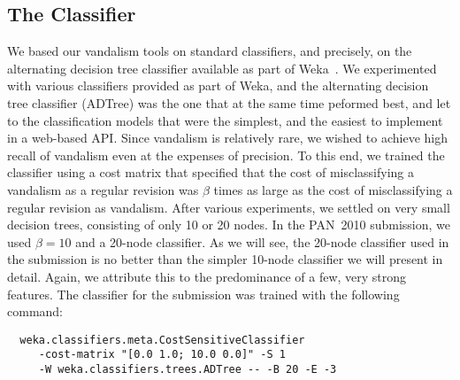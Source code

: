 \subsection{The Classifier}

We based our vandalism tools on standard classifiers, and precisely, on the alternating decision tree classifier available as part of Weka~\cite{Weka09}.
We experimented with various classifiers provided as part of Weka, and the alternating decision tree classifier (ADTree) was the one that at the same time peformed best, and let to the classification models that were the simplest, and the easiest to implement in a web-based API.
Since vandalism is relatively rare, we wished to achieve high recall of vandalism even at the expenses of precision.
To this end, we trained the classifier using a cost matrix that specified that the cost of misclassifying a vandalism as a regular revision was $\beta$ times as large as the cost of misclassifying a regular revision as vandalism.
After various experiments, we settled on very small decision trees, consisting of only 10 or 20 nodes.
In the PAN~2010 submission, we used $\beta=10$ and a 20-node classifier.
As we will see, the 20-node classifier used in the submission is no better than the simpler 10-node classifier we will present in detail.
Again, we attribute this to the predominance of a few, very strong features.
The classifier for the submission was trained with the following command:
%
{\small
\begin{verbatim}
  weka.classifiers.meta.CostSensitiveClassifier
     -cost-matrix "[0.0 1.0; 10.0 0.0]" -S 1
     -W weka.classifiers.trees.ADTree -- -B 20 -E -3
\end{verbatim}
}

